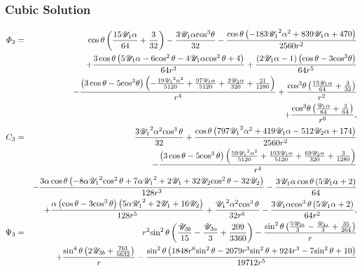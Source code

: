 \subsubsection{Cubic Solution}

\begin{eqnarray*}
\varPhi_3 &=& \cos\theta \left(\frac{15 \cU_1\alpha}{64} + \frac{3}{32}\right) - \frac{3 \cU_1\alpha {\cos}^3\theta}{32} - \frac{\cos\theta \left( - 183 {\cU_1}^2\alpha^2 + 839 \cU_1\alpha + 470\right)}{2560 r^2} \\ 
&&+ \frac{3 \cos\theta \left(5 \cU_1\alpha - 6 {\cos^2\theta} - 4 \cU_1\alpha {\cos^2\theta} + 4\right)}{64 r^3} + \frac{\left(2 \cU_1\alpha - 1\right) \left(\cos\theta - 3 {\cos}^3\theta\right)}{64 r^5} 
\\ 
&&- \frac{\left(3 \cos\theta - 5 {\cos}^3\theta\right) \left( - \frac{19 {\cU_1}^2\alpha^2}{5120} + \frac{97 \cU_1\alpha}{5120} + \frac{3 \cU_2\alpha}{320} + \frac{21}{1280}\right)}{r^4} + \frac{{\cos}^3\theta \left(\frac{15 \cU_1\alpha}{64} + \frac{3}{32}\right)}{r^2} \\ 
&&+ \frac{{\cos}^3\theta \left(\frac{\cU_1\alpha}{64} + \frac{3}{64}\right)}{r^6},
\\
C_3 &=&
\frac{3 {{\cU_1}}^2\alpha^2 {\cos^3\theta}}{32} + \frac{\cos\theta \left(797 {{\cU_1}}^2\alpha^2 + 419 {\cU_1}\alpha - 512 {\cU_2}\alpha + 174\right)}{2560 r^2} \\
&&- \frac{\left(3 \cos\theta - 5 {\cos^3\theta}\right) \left(\frac{59 {{\cU_1}}^2\alpha^2}{5120} + \frac{103 {\cU_1}\alpha}{5120} + \frac{69 {\cU_2}\alpha}{320} + \frac{3}{1280}\right)}{r^4} \\
&&- \frac{3\alpha \cos\theta \left( - 8\alpha {{\cU_1}}^2 {\cos^2\theta} + 7\alpha {{\cU_1}}^2 + 2 {\cU_1} + 32 {\cU_2} {\cos^2\theta} - 32 {\cU_2}\right)}{128 r^3} - \frac{3 {\cU_1}\alpha \cos\theta \left(5 {\cU_1}\alpha + 2\right)}{64} \\
&&+ \frac{\alpha \left(\cos\theta - 3 {\cos^3\theta}\right) \left(5\alpha {{\cU_1}}^2 + 2 {\cU_1} + 16 {\cU_2}\right)}{128 r^5} + \frac{{{\cU_1}}^2\alpha^2 {\cos^3\theta}}{32 r^6} - \frac{3 {\cU_1}\alpha {\cos^3\theta} \left(5 {\cU_1}\alpha + 2\right)}{64 r^2},
\\
\Psi_3 &=&
r^2 {\sin^2\theta} \left(\frac{{\cU_{3b}}}{15} - \frac{{\cU_{3a}}}{3} + \frac{209}{3360}\right) 
 - \frac{{\sin^2\theta} \left(\frac{5 {\cU_{3b}}}{3} - \frac{{\cU_{3a}}}{3} + \frac{35}{264}\right)}{r}
\\ && + \frac{{\sin^4\theta} \left(2 {\cU_{3b}} + \frac{761}{5632}\right)}{r} - \frac{{\sin^2\theta} \left(1848 r^6 {\sin^2\theta} - 2079 r^3 {\sin^2\theta} + 924 r^3 - 7 {\sin^2\theta} + 10\right)}{19712 r^5} 

\end{eqnarray*}
